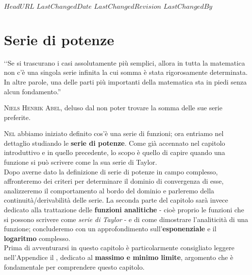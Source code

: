 \svnidlong
{$HeadURL$}
{$LastChangedDate$}
{$LastChangedRevision$}
{$LastChangedBy$}

\chapter{Serie di potenze}

\begin{introduction}
	‘‘Se si trascurano i casi assolutamente più semplici, allora in tutta la matematica non c'è una singola serie infinita la cui somma è stata rigorosamente determinata. In altre parole, una delle parti più importanti della matematica sta in piedi senza alcun fondamento.''
	\begin{flushright}
		\textsc{Niels Henrik Abel,} deluso dal non poter trovare la somma delle sue serie preferite.
	\end{flushright}
\end{introduction}
\lettrine[findent=1pt, nindent=0pt]{N}{el}  abbiamo iniziato definito cos'è una serie di funzioni; ora entriamo nel dettaglio studiando le \textbf{serie di potenze}. Come già accennato nel capitolo introduttivo e in quello precedente, lo scopo è quello di capire quando una funzione si può scrivere come la sua serie di Taylor.\\
Dopo averne dato la definizione di serie di potenze in campo complesso, affronteremo dei criteri per determinare il dominio di convergenza di esse, analizzeremo il comportamento al bordo del dominio e parleremo della continuità/derivabilità delle serie. La seconda parte del capitolo sarà invece dedicato alla trattazione delle \textbf{funzioni analitiche} - cioè proprio le funzioni che si possono scrivere come \textit{serie di Taylor} - e di come dimostrare l'analiticità di una funzione; concluderemo con un approfondimento sull'\textbf{esponenziale} e il \textbf{logaritmo} complesso.\\
Prima di avventurarsi in questo capitolo è particolarmente consigliato leggere nell'Appendice il , dedicato al \textbf{massimo e minimo limite}, argomento che è fondamentale per comprendere questo capitolo.
